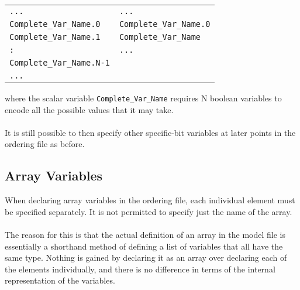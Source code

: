 \begin{small} 
\begin{tabular}{ll} \texttt{...} &
\texttt{...}\\ \texttt{Complete\_Var\_Name.0} &
\texttt{Complete\_Var\_Name.0}\\ \texttt{Complete\_Var\_Name.1} &
\texttt{Complete\_Var\_Name}\\ \texttt{:} & \texttt{...}\\
\texttt{Complete\_Var\_Name.N-1}\\ \texttt{...} &
\end{tabular}
\end{small}

\noindent where the scalar variable \texttt{Complete\_Var\_Name}
requires N boolean variables to encode all the possible values that it
may take.\\ \\ It is still possible to then specify other specific-bit
variables at later points in the ordering file as before.\\

\subsection{Array Variables}
\label{Array Variables}

When declaring array variables in the ordering file, each individual
element must be specified separately. It is not permitted to specify
just the name of the array.\\
\\
The reason for this is that the actual definition of an array in the
model file is essentially a shorthand method of defining a list of
variables that all have the same type. Nothing is gained by declaring
it as an array over declaring each of the elements individually, and
there is no difference in terms of the internal representation of the
variables.
